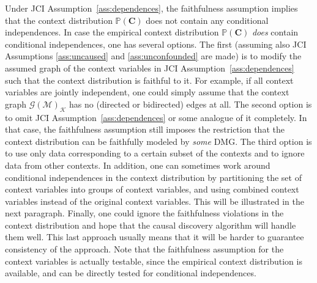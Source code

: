 \documentclass[twoside,11pt]{article}
\newcommand{\Prb}{\mathbb{P}}
\newcommand\B[1]{\bm{#1}}
\newcommand\C[1]{\mathcal{#1}}
\newcommand{\Joris}[1]{{\color{blue}#1}}
\begin{document}
Under JCI Assumption~\ref{ass:dependences}, the faithfulness assumption implies that the
context distribution $\Prb(\B{C})$ does not contain any conditional
independences. In case the empirical context distribution $\Prb(\B{C})$
\emph{does} contain conditional independences, one has several options. The
first (assuming also JCI Assumptions \ref{ass:uncaused} and \ref{ass:unconfounded} are made) 
is to modify the assumed graph of the context variables in JCI
Assumption~\ref{ass:dependences} such that the context distribution is faithful
to it. For example, if all context variables are jointly independent, one could simply
assume that the context graph $\C{G}(\C{M})_{\C{K}}$ has no (directed or bidirected)
edges at all. The second option is to omit JCI Assumption~\ref{ass:dependences} or some
analogue of it completely.
In that case, the faithfulness assumption still imposes the restriction that the
context distribution can be faithfully modeled by \emph{some} DMG. The third option 
is to use only data corresponding to a certain subset of
the contexts and to ignore data from other contexts. In addition, one can
sometimes work around conditional independences in the context distribution by partitioning the set of
context variables into groups of context variables, and using combined context
variables instead of the original context variables. This will be
illustrated in the next paragraph. Finally, one could ignore the faithfulness
violations in the context distribution and hope that the causal discovery
algorithm will handle them well. This last approach usually means that it 
will be harder to guarantee consistency of the approach.
Note that the faithfulness assumption for the context variables is actually testable, 
since the empirical context distribution is available, and can be directly tested for conditional independences.

%
%
\end{document}
